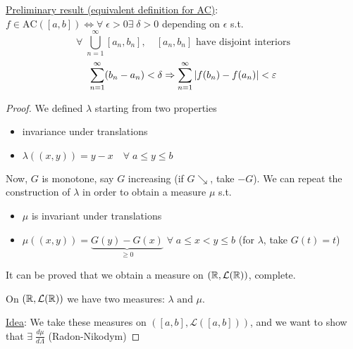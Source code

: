 \noindent\underline{Preliminary result (equivalent definition for AC)}: \(f \in \mbox{AC}([a,b]) \Leftrightarrow \forall \; \epsilon > 0 \exists \; \delta > 0\) depending on \(\epsilon\) s.t. 
\[
    \forall \; \bigcup_{n=1}^{\infty} [a_n, b_n], \quad [a_n, b_n] \mbox{ have disjoint interiors}
\]
\[
    \sum_{n=1}^{\infty} (b_n -a_n) < \delta \Rightarrow \sum_{n=1}^{\infty} \abs{f(b_n) - f(a_n)} < \varepsilon
\]
\begin{proof}
    We defined \(\lambda\) starting from two properties
    \begin{itemize}
        \item invariance under translations
        \item \(\lambda((x,y)) = y - x \quad \forall \; a \leq  y \leq b\)
    \end{itemize}
    Now, \(G\) is monotone, say \(G\) increasing (if \(G \searrow\), take \(-G\)). We can repeat the construction of \(\lambda\) in order to obtain a measure \(\mu\) s.t. 
    \begin{itemize}
        \item \(\mu\) is invariant under translations
        \item \(\mu((x,y)) = \underbrace{G(y) - G(x)}_{\geq 0}\) \(\forall \; a \leq x < y \leq b\) (for \(\lambda\), take \(G(t) = t\))
    \end{itemize}
It can be proved that we obtain a measure on \((\mathbb{R}, \mathcal{L}(\mathbb{R}))\), complete.

On \((\mathbb{R}, \mathcal{L}(\mathbb{R}))\) we have two measures: \(\lambda \mbox{ and } \mu\).

\noindent\underline{Idea}: We take these measures on \(([a,b], \mathcal{L}([a,b]))\), and we want to show that \(\exists \; \frac{d\mu}{d\Lambda}\) (Radon-Nikodym)


\end{proof}
